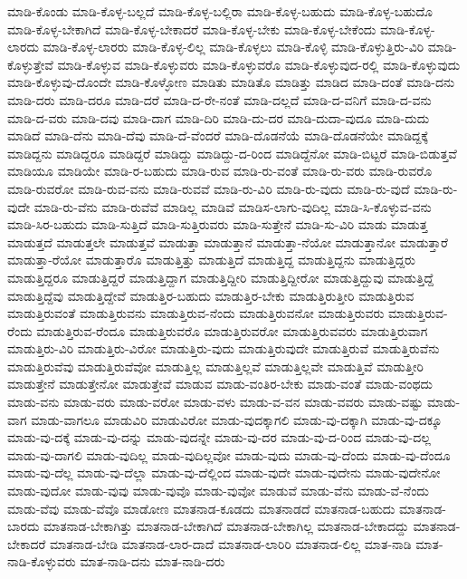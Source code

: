 {ಮಾಡಿ-ಕೊಂಡು
ಮಾಡಿ-ಕೊಳ್ಳ-ಬಲ್ಲದೆ
ಮಾಡಿ-ಕೊಳ್ಳ-ಬಲ್ಲಿರಾ
ಮಾಡಿ-ಕೊಳ್ಳ-ಬಹುದು
ಮಾಡಿ-ಕೊಳ್ಳ-ಬಹುದೊ
ಮಾಡಿ-ಕೊಳ್ಳ-ಬೇಕಾಗಿದೆ
ಮಾಡಿ-ಕೊಳ್ಳ-ಬೇಕಾದರೆ
ಮಾಡಿ-ಕೊಳ್ಳ-ಬೇಕು
ಮಾಡಿ-ಕೊಳ್ಳ-ಬೇಕೆಂದು
ಮಾಡಿ-ಕೊಳ್ಳ-ಲಾರದು
ಮಾಡಿ-ಕೊಳ್ಳ-ಲಾರರು
ಮಾಡಿ-ಕೊಳ್ಳ-ಲಿಲ್ಲ
ಮಾಡಿ-ಕೊಳ್ಳಲು
ಮಾಡಿ-ಕೊಳ್ಳಿ
ಮಾಡಿ-ಕೊಳ್ಳುತ್ತಿರು-ವಿರಿ
ಮಾಡಿ-ಕೊಳ್ಳುತ್ತೇವೆ
ಮಾಡಿ-ಕೊಳ್ಳುವ
ಮಾಡಿ-ಕೊಳ್ಳುವರು
ಮಾಡಿ-ಕೊಳ್ಳುವರೊ
ಮಾಡಿ-ಕೊಳ್ಳುವುದ-ರಲ್ಲಿ
ಮಾಡಿ-ಕೊಳ್ಳುವುದು
ಮಾಡಿ-ಕೊಳ್ಳುವು-ದೊಂದೇ
ಮಾಡಿ-ಕೊಳ್ಳೋಣ
ಮಾಡಿತು
ಮಾಡಿತೊ
ಮಾಡಿತ್ತು
ಮಾಡಿದ
ಮಾಡಿ-ದಂತೆ
ಮಾಡಿ-ದನು
ಮಾಡಿ-ದರು
ಮಾಡಿ-ದರೂ
ಮಾಡಿ-ದರೆ
ಮಾಡಿ-ದ-ರೇ-ನಂತೆ
ಮಾಡಿ-ದಲ್ಲದೆ
ಮಾಡಿ-ದ-ವನಿಗೆ
ಮಾಡಿ-ದ-ವನು
ಮಾಡಿ-ದ-ವರು
ಮಾಡಿ-ದವು
ಮಾಡಿ-ದಾಗ
ಮಾಡಿ-ದಿರಿ
ಮಾಡಿ-ದು-ದರ
ಮಾಡಿ-ದುದಾ-ವುದೂ
ಮಾಡಿ-ದುದು
ಮಾಡಿದೆ
ಮಾಡಿ-ದೆನು
ಮಾಡಿ-ದೆವು
ಮಾಡಿ-ದೆ-ವೆಂದರೆ
ಮಾಡಿ-ದೊಡನೆಯೆ
ಮಾಡಿ-ದೊಡನೆಯೇ
ಮಾಡಿದ್ದಕ್ಕೆ
ಮಾಡಿದ್ದನು
ಮಾಡಿದ್ದರೂ
ಮಾಡಿದ್ದರೆ
ಮಾಡಿದ್ದು
ಮಾಡಿದ್ದು-ದ-ರಿಂದ
ಮಾಡಿದ್ದೆನೋ
ಮಾಡಿ-ಬಿಟ್ಟರೆ
ಮಾಡಿ-ಬಿಡುತ್ತವೆ
ಮಾಡಿಯೂ
ಮಾಡಿಯೇ
ಮಾಡಿ-ರ-ಬಹುದು
ಮಾಡಿ-ರುವ
ಮಾಡಿ-ರು-ವಂತೆ
ಮಾಡಿ-ರು-ವರು
ಮಾಡಿ-ರುವರೊ
ಮಾಡಿ-ರುವರೋ
ಮಾಡಿ-ರುವ-ವನು
ಮಾಡಿ-ರುವವೆ
ಮಾಡಿ-ರು-ವಿರಿ
ಮಾಡಿ-ರು-ವುದು
ಮಾಡಿ-ರು-ವುದೆ
ಮಾಡಿ-ರು-ವುದೇ
ಮಾಡಿ-ರು-ವೆನು
ಮಾಡಿ-ರುವೆವೆ
ಮಾಡಿಲ್ಲ
ಮಾಡಿವೆ
ಮಾಡಿಸ-ಲಾಗು-ವುದಿಲ್ಲ
ಮಾಡಿ-ಸಿ-ಕೊಳ್ಳುವ-ವನು
ಮಾಡಿ-ಸಿರ-ಬಹುದು
ಮಾಡಿ-ಸುತ್ತಿದೆ
ಮಾಡಿ-ಸುತ್ತಿರುವರು
ಮಾಡಿ-ಸುತ್ತೇನೆ
ಮಾಡಿ-ಸು-ವಿರಿ
ಮಾಡು
ಮಾಡುತ್ತ
ಮಾಡುತ್ತದೆ
ಮಾಡುತ್ತಲೇ
ಮಾಡುತ್ತವೆ
ಮಾಡುತ್ತಾ
ಮಾಡುತ್ತಾನೆ
ಮಾಡುತ್ತಾ-ನೆಯೋ
ಮಾಡುತ್ತಾನೋ
ಮಾಡುತ್ತಾರೆ
ಮಾಡುತ್ತಾ-ರೆಯೋ
ಮಾಡುತ್ತಾರೊ
ಮಾಡುತ್ತಿತ್ತು
ಮಾಡುತ್ತಿದೆ
ಮಾಡುತ್ತಿದ್ದ
ಮಾಡುತ್ತಿದ್ದನು
ಮಾಡುತ್ತಿದ್ದರು
ಮಾಡುತ್ತಿದ್ದರೂ
ಮಾಡುತ್ತಿದ್ದರೆ
ಮಾಡುತ್ತಿದ್ದಾಗ
ಮಾಡುತ್ತಿದ್ದೀರಿ
ಮಾಡುತ್ತಿದ್ದೀರೋ
ಮಾಡುತ್ತಿದ್ದುವು
ಮಾಡುತ್ತಿದ್ದೆ
ಮಾಡುತ್ತಿದ್ದೆವು
ಮಾಡುತ್ತಿದ್ದೇವೆ
ಮಾಡುತ್ತಿರ-ಬಹುದು
ಮಾಡುತ್ತಿರ-ಬೇಕು
ಮಾಡುತ್ತಿರುತ್ತೀರಿ
ಮಾಡುತ್ತಿರುವ
ಮಾಡುತ್ತಿರುವಂತೆ
ಮಾಡುತ್ತಿರುವನು
ಮಾಡುತ್ತಿರುವ-ನೆಂದು
ಮಾಡುತ್ತಿರುವನೋ
ಮಾಡುತ್ತಿರುವರು
ಮಾಡುತ್ತಿರುವ-ರೆಂದು
ಮಾಡುತ್ತಿರುವ-ರೆಂದೂ
ಮಾಡುತ್ತಿರುವರೊ
ಮಾಡುತ್ತಿರುವರೋ
ಮಾಡುತ್ತಿರುವವರು
ಮಾಡುತ್ತಿರುವಾಗ
ಮಾಡುತ್ತಿರು-ವಿರಿ
ಮಾಡುತ್ತಿರು-ವಿರೋ
ಮಾಡುತ್ತಿರು-ವುದು
ಮಾಡುತ್ತಿರುವುದೇ
ಮಾಡುತ್ತಿರುವೆ
ಮಾಡುತ್ತಿರುವೆನು
ಮಾಡುತ್ತಿರುವೆವು
ಮಾಡುತ್ತಿರುವೆವೋ
ಮಾಡುತ್ತಿಲ್ಲ
ಮಾಡುತ್ತಿಲ್ಲವೆ
ಮಾಡುತ್ತಿಲ್ಲವೇ
ಮಾಡುತ್ತಿವೆ
ಮಾಡುತ್ತೀರಿ
ಮಾಡುತ್ತೇನೆ
ಮಾಡುತ್ತೇನೋ
ಮಾಡುತ್ತೇವೆ
ಮಾಡುವ
ಮಾಡು-ವಂತಿರ-ಬೇಕು
ಮಾಡು-ವಂತೆ
ಮಾಡು-ವಂಥದು
ಮಾಡು-ವನು
ಮಾಡು-ವರು
ಮಾಡು-ವರೋ
ಮಾಡು-ವಳು
ಮಾಡು-ವ-ವನ
ಮಾಡು-ವವರು
ಮಾಡು-ವಷ್ಟು
ಮಾಡು-ವಾಗ
ಮಾಡು-ವಾಗಲೂ
ಮಾಡುವಿರಿ
ಮಾಡುವಿರೋ
ಮಾಡು-ವುದಕ್ಕಾಗಲಿ
ಮಾಡು-ವು-ದಕ್ಕಾಗಿ
ಮಾಡು-ವು-ದಕ್ಕೂ
ಮಾಡು-ವು-ದಕ್ಕೆ
ಮಾಡು-ವು-ದನ್ನು
ಮಾಡು-ವುದನ್ನೇ
ಮಾಡು-ವು-ದರ
ಮಾಡು-ವು-ದ-ರಿಂದ
ಮಾಡು-ವು-ದಲ್ಲ
ಮಾಡು-ವು-ದಾಗಲಿ
ಮಾಡು-ವುದಿಲ್ಲ
ಮಾಡು-ವುದಿಲ್ಲವೋ
ಮಾಡು-ವುದು
ಮಾಡು-ವು-ದೆಂದು
ಮಾಡು-ವು-ದೆಂದೂ
ಮಾಡು-ವು-ದೆಲ್ಲ
ಮಾಡು-ವು-ದೆಲ್ಲಾ
ಮಾಡು-ವು-ದೆಲ್ಲಿಂದ
ಮಾಡು-ವುದೇ
ಮಾಡು-ವುದೇನು
ಮಾಡು-ವುದೇನೋ
ಮಾಡು-ವುದೋ
ಮಾಡು-ವುವು
ಮಾಡು-ವುವೊ
ಮಾಡು-ವುವೋ
ಮಾಡುವೆ
ಮಾಡು-ವೆನು
ಮಾಡು-ವೆ-ನೆಂದು
ಮಾಡು-ವೆವು
ಮಾಡು-ವೆವೊ
ಮಾಡೋಣ
ಮಾತನಾಡ-ಕೂಡದು
ಮಾತನಾಡದೆ
ಮಾತನಾಡ-ಬಹುದು
ಮಾತನಾಡ-ಬಾರದು
ಮಾತನಾಡ-ಬೇಕಾಗಿತ್ತು
ಮಾತನಾಡ-ಬೇಕಾಗಿದೆ
ಮಾತನಾಡ-ಬೇಕಾಗಿಲ್ಲ
ಮಾತನಾಡ-ಬೇಕಾದದ್ದು
ಮಾತನಾಡ-ಬೇಕಾದರೆ
ಮಾತನಾಡ-ಬೇಡಿ
ಮಾತನಾಡ-ಲಾರ-ದಾದೆ
ಮಾತನಾಡ-ಲಾರಿರಿ
ಮಾತನಾಡ-ಲಿಲ್ಲ
ಮಾತ-ನಾಡಿ
ಮಾತ-ನಾಡಿ-ಕೊಳ್ಳುವರು
ಮಾತ-ನಾಡಿ-ದನು
ಮಾತ-ನಾಡಿ-ದರು
}
